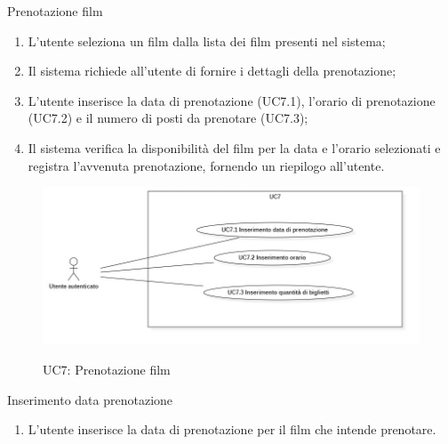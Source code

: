\begin{usecase}{7}{Prenotazione film}\label{uc:prenotazione-film}
  \usecasemain{}
  
  \begin{enumerate}
    \item L'utente seleziona un film dalla lista dei film presenti nel sistema;
    \item Il sistema richiede all'utente di fornire i dettagli della prenotazione; 
    \item L'utente inserisce la data di prenotazione (UC7.1), l'orario di prenotazione (UC7.2) e il numero di posti da prenotare (UC7.3);
    \item Il sistema verifica la disponibilità del film per la data e l'orario selezionati e registra l'avvenuta prenotazione, fornendo un riepilogo all'utente.
  \end{enumerate}
\end{usecase}

\begin{figure}[!h] 
  \centering 
  \includegraphics[width=0.9\columnwidth, alt={Caso d'uso relativo alla prenotazione di un film dell'utente}]{immagini/usecase/UC7.jpg}
  \caption{UC7: Prenotazione film}\label{fig:uc:prenotazione-film}
\end{figure}

\begin{usecase}{7.1}{Inserimento data prenotazione}\label{uc:inserimento-data-prenotazione}
  \usecasemain{}
  
  \begin{enumerate}
    \item L'utente inserisce la data di prenotazione per il film che intende prenotare.
  \end{enumerate}
\end{usecase}

